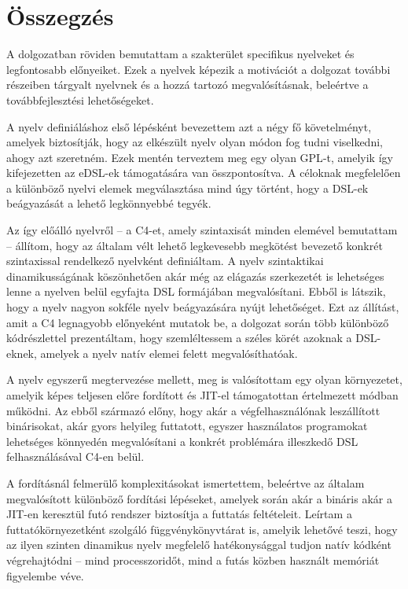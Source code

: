 \chapter*{Összegzés}

A dolgozatban röviden bemutattam a szakterület specifikus nyelveket és legfontosabb előnyeiket.
Ezek a nyelvek képezik a motivációt a dolgozat további részeiben tárgyalt nyelvnek és a hozzá tartozó megvalósításnak, beleértve a továbbfejlesztési lehetőségeket.

A nyelv definiáláshoz első lépésként bevezettem azt a négy fő követelményt, amelyek biztosítják, hogy az elkészült nyelv olyan módon fog tudni viselkedni, ahogy azt szeretném.
Ezek mentén terveztem meg egy olyan \gls{GPL}-t, amelyik így kifejezetten az \gls{eDSL}-ek támogatására van összpontosítva.
A céloknak megfelelően a különböző nyelvi elemek megválasztása mind úgy történt, hogy a \gls{DSL}-ek beágyazását a lehető legkönnyebbé tegyék.

Az így előálló nyelvről -- a C4-et, amely szintaxisát minden elemével bemutattam -- állítom, hogy az általam vélt lehető legkevesebb megkötést bevezető konkrét szintaxissal rendelkező nyelvként definiáltam.
A nyelv szintaktikai dinamikusságának köszönhetően akár még az elágazás szerkezetét is lehetséges lenne a nyelven belül egyfajta \gls{DSL} formájában megvalósítani.
Ebből is látszik, hogy a nyelv nagyon sokféle nyelv beágyazására nyújt lehetőséget.
Ezt az állítást, amit a C4 legnagyobb előnyeként mutatok be, a dolgozat során több különböző kódrészlettel prezentáltam, hogy szemléltessem a széles körét azoknak a \gls{DSL}-eknek, amelyek a nyelv natív elemei felett megvalósíthatóak.

A nyelv egyszerű megtervezése mellett, meg is valósítottam egy olyan környezetet, amelyik képes teljesen előre fordított és \gls{JIT}-el támogatottan értelmezett módban működni.
Az ebből származó előny, hogy akár a végfelhasználónak leszállított binárisokat, akár gyors helyileg futtatott, egyszer használatos programokat lehetséges könnyedén megvalósítani a konkrét problémára illeszkedő \gls{DSL} felhasználásával C4-en belül.

A fordításnál felmerülő komplexitásokat ismertettem, beleértve az általam megvalósított különböző fordítási lépéseket, amelyek során akár a bináris akár a \gls{JIT}-en keresztül futó rendszer biztosítja a futtatás feltételeit.
Leírtam a futtatókörnyezetként szolgáló függvénykönyvtárat is, amelyik lehetővé teszi, hogy az ilyen szinten dinamikus nyelv megfelelő hatékonysággal tudjon natív kódként végrehajtódni -- mind processzoridőt, mind a futás közben használt memóriát figyelembe véve.

